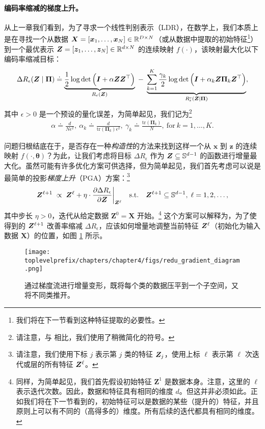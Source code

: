 \documentclass[../../book-main_zh.tex]{subfiles}
\begin{document}
\paragraph{编码率缩减的梯度上升。} 从上一章我们看到，为了寻求一个线性判别表示（LDR），在数学上，我们本质上是在寻找一个从数据 $\bm{X} = [\bm{x}_1, \ldots, \bm{x}_N] \in \mathbb{R}^{D \times N}$（或从数据中提取的初始特征\footnote{我们将在下一节看到这种特征提取的必要性。}）到一个最优表示 $\bm{Z} = [\bm{z}_1, \ldots, \bm{z}_N] \in \mathbb{R}^{d \times N}$ 的连续映射 $f(\cdot)$，该映射最大化以下编码率缩减目标：
\begin{equation}\label{eq:mcr-formulation}
\begin{split}
\Delta R_{\epsilon}(\bm{Z} \mid \bm{\Pi}) \doteq \underbrace{\frac{1}{2}\log\det \Big(\bm{I} + {\alpha} \bm{Z} \bm{Z}^{\top} \Big)}_{R_{\epsilon}(\bm{Z})} \;-\; \underbrace{\sum_{k=1}^{K}\frac{\gamma_{k}}{2} \log\det\Big(\bm{I} + {\alpha_{k}} \bm{Z} \bm{\Pi}_{k} \bm{Z}^{\top} \Big)}_{R_{\epsilon}^c(\bm{Z} \mid \bm \Pi)},
\end{split}
\end{equation}
其中 $\epsilon > 0$ 是一个预设的量化误差，为简单起见，我们记为\footnote{请注意，与  相比，我们使用了稍微简化的符号。}
\begin{align*}
    \alpha \doteq \frac{d}{N\epsilon^2},\ \alpha_{k} \doteq \frac{d}{\mathrm{tr}(\bm{\Pi}_{k})\epsilon^2},\ \gamma_{k} \doteq \frac{\mathrm{tr}(\bm{\Pi}_{k})}{N},\ \text{for}\ k = 1,\ldots, K.
\end{align*}

问题归根结底在于，是否存在一种{\em 构造性}的方法来找到这样一个从 $\bm x$ 到 $\bm z$ 的连续映射 $f(\cdot,\bm \theta)$？为此，让我们考虑将目标 $\Delta R_{\epsilon}$ 作为 $\bm{Z} \subseteq \mathbb{S}^{d-1}$ 的函数进行增量最大化。虽然可能有许多优化方案可供选择，但为简单起见，我们首先考虑可以说是最简单的投影{\em 梯度上升}（PGA）方案：\footnote{请注意，我们使用下标 $j$ 表示第 $j$ 类的特征 $\bm{Z}_j$，使用上标 $\ell$ 表示第 $\ell$ 次迭代或层的所有特征 $\bm{Z}^{\ell}$。}
\begin{equation}
\bm Z^{\ell+1}   \; \propto \; \bm Z^{\ell} + \eta \cdot \frac{\partial \Delta R_{\epsilon}}{\partial \bm Z}\bigg|_{\bm{Z}^{\ell}}
\quad \mbox{s.t.} \quad \bm{Z}^{\ell+1} \subseteq \mathbb{S}^{d-1}, \; \ell = 1, 2, \ldots,
\label{eqn:gradient-descent}
\end{equation}
其中步长 $\eta >0$，迭代从给定数据 $\bm Z^{0} = \bm X$ 开始。\footnote{同样，为简单起见，我们首先假设初始特征 $\bm Z^{1}$ 是数据本身。注意，这里的 $\ell$ 表示迭代次数。因此，数据和特征具有相同的维度 $d$。但这并非必须如此。正如我们将在下一节看到的，初始特征可以是数据的某些（提升的）特征，并且原则上可以有不同的（高得多的）维度。所有后续的迭代都具有相同的维度。}
这个方案可以解释为，为了使得到的 $\bm{Z}^{\ell +1}$ 改善率缩减 $\Delta R_{\epsilon}$，应该如何增量地调整当前特征 $\bm{Z}^\ell$（初始化为输入数据 $\bm X$）的位置，如图 \ref{fig:gradient-flow} 所示。
\begin{figure}
\centering
    \texttt{[image: \\toplevelprefix/chapters/chapter4/figs/redu\_gradient\_diagram.png]}
    \caption{通过梯度流进行增量变形，既将每个类的数据压平到一个子空间，又将不同类推开。}
    \label{fig:gradient-flow}
\end{figure}
\end{document}
